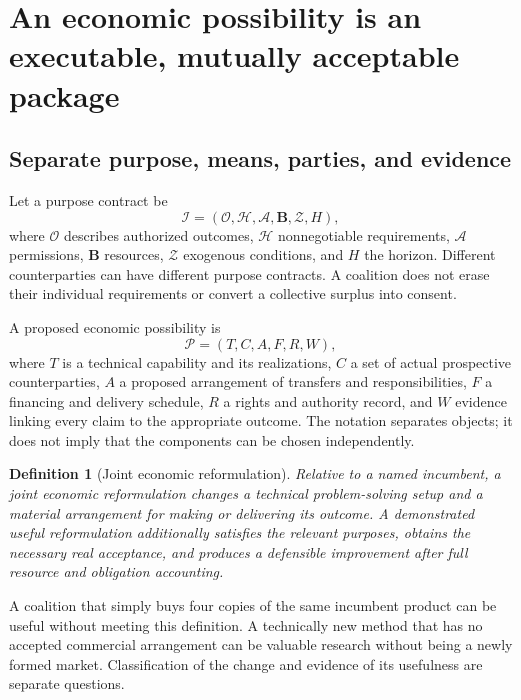 \documentclass[11pt,letterpaper]{article}
\newcommand{\I}{\mathcal I}\newcommand{\K}{\mathcal K}
\newtheorem{definition}{Definition}[section]
\theoremstyle{remark}\newtheorem{remark}{Remark}[section]
\begin{document}
\section{An economic possibility is an executable, mutually acceptable package}
\label{sec:objects}
\subsection{Separate purpose, means, parties, and evidence}
Let a purpose contract be
\begin{equation}
\I=(\mathcal O,\mathcal H,\mathcal A,\mathbf B,\mathcal Z,H),
\end{equation}
where $\mathcal O$ describes authorized outcomes, $\mathcal H$ nonnegotiable requirements, $\mathcal A$ permissions, $\mathbf B$ resources, $\mathcal Z$ exogenous conditions, and $H$ the horizon. Different counterparties can have different purpose contracts. A coalition does not erase their individual requirements or convert a collective surplus into consent.

A proposed economic possibility is
\begin{equation}\label{eq:package}
\mathcal P=(T,C,A,F,R,W),
\end{equation}
where $T$ is a technical capability and its realizations, $C$ a set of actual prospective counterparties, $A$ a proposed arrangement of transfers and responsibilities, $F$ a financing and delivery schedule, $R$ a rights and authority record, and $W$ evidence linking every claim to the appropriate outcome. The notation separates objects; it does not imply that the components can be chosen independently.

\begin{definition}[Joint economic reformulation]
Relative to a named incumbent, a joint economic reformulation changes a technical problem-solving setup and a material arrangement for making or delivering its outcome. A \emph{demonstrated useful reformulation} additionally satisfies the relevant purposes, obtains the necessary real acceptance, and produces a defensible improvement after full resource and obligation accounting.
\end{definition}
A coalition that simply buys four copies of the same incumbent product can be useful without meeting this definition. A technically new method that has no accepted commercial arrangement can be valuable research without being a newly formed market. Classification of the change and evidence of its usefulness are separate questions.
\end{document}
